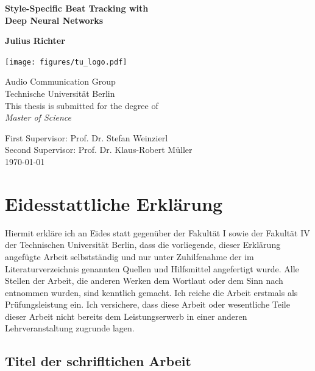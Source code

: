 \documentclass{scrartcl}
\begin{document}
\pagestyle{plain}

\begin{titlepage}
\begin{center}
\vspace*{1cm}
\huge
\textbf{Style-Specific Beat Tracking with\\ Deep Neural Networks}
\vspace{2.0cm}

\Large
\textbf{Julius Richter}
\vspace{0.8cm}

\texttt{[image: figures/tu\_logo.pdf]}

\vspace{0.4cm}
Audio Communication Group\\
Technische Universität Berlin\\
\vspace{2.5cm}
This thesis is submitted for the degree of\\
\emph{Master of Science}

\vspace{2.5cm}
First Supervisor: Prof. Dr. Stefan Weinzierl \\
Second Supervisor: Prof. Dr. Klaus-Robert Müller\\
\vspace{1.5cm}
\today
\end{center}
\end{titlepage}


\section*{Eidesstattliche Erklärung}
Hiermit erkläre ich an Eides statt gegenüber der Fakultät I sowie der Fakultät IV der Technischen Universität Berlin, dass die vorliegende, dieser Erklärung angefügte Arbeit selbstständig und nur unter Zuhilfenahme der im Literaturverzeichnis genannten Quellen und Hilfsmittel angefertigt wurde. Alle Stellen der Arbeit, die anderen
Werken dem Wortlaut oder dem Sinn nach entnommen wurden, sind kenntlich gemacht. Ich reiche die Arbeit erstmals als Prüfungsleistung ein. Ich versichere, dass diese Arbeit oder wesentliche Teile dieser Arbeit nicht bereits dem Leistungserwerb in einer anderen Lehrveranstaltung zugrunde lagen. 

\vspace{1em}
\subsection*{Titel der schrifltichen Arbeit}
\end{document}
